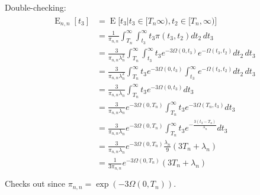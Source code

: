\documentclass{article}
\DeclareMathOperator{\E}{E}
\begin{document}
Double-checking:
\begin{align}
    \begin{split}
        \E_{n,n}[t_3] &= \E\big[t_3|t_3 \in [T_n \infty),t_2 \in [T_n,\infty) \big]\\
                      &= \frac{1}{\pi_{n,n}}\int_{T_n}^{\infty}\int_{t_3}^{\infty}t_3\pi(t_3,t_2)dt_2\,dt_3\\
                      &= \frac{3}{\pi_{n,n}\lambda_n^2}\int_{T_n}^{\infty}\int_{t_3}^{\infty}
                        t_3 e^{-3\Omega(0,t_3)}e^{-\Omega(t_3,t_2)}dt_2\,dt_3\\
                      &= \frac{3}{\pi_{n,n}\lambda_n^2}\int_{T_n}^{\infty}
                        t_3 e^{-3\Omega(0,t_3)}\int_{t_3}^{\infty}e^{-\Omega(t_3,t_2)}dt_2\,dt_3\\
                      &= \frac{3}{\pi_{n,n}\lambda_n}\int_{T_n}^{\infty}
                        t_3 e^{-3\Omega(0,t_3)}dt_3\\
                      &= \frac{3}{\pi_{n,n}\lambda_n}e^{-3\Omega(0,T_n)}\int_{T_n}^{\infty}
                        t_3 e^{-3\Omega(T_n,t_3)}dt_3\\
                      &= \frac{3}{\pi_{n,n}\lambda_n}e^{-3\Omega(0,T_n)}\int_{T_n}^{\infty}
                        t_3 e^{-\frac{3(t_3-T_n)}{\lambda_n}}dt_3\\
                      &= \frac{3}{\pi_{n,n}\lambda_n}e^{-3\Omega(0,T_n)}
                        \frac{\lambda_n}{9}(3T_n+\lambda_n)\\
                      &= \frac{1}{3\pi_{n,n}}e^{-3\Omega(0,T_n)}
                        (3T_n+\lambda_n)\\
    \end{split}
\end{align}
Checks out since $\pi_{n,n} = \exp(-3\Omega(0,T_n))$.
\end{document}
